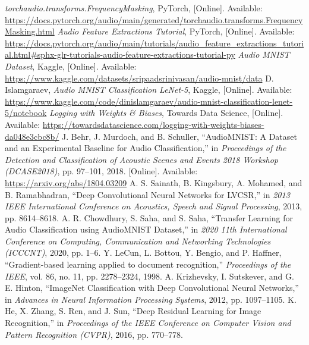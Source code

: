 \documentclass[conference]{IEEEtran}
\begin{document}
\begin{thebibliography}{00}
 \textit{torchaudio.transforms.FrequencyMasking}, PyTorch, [Online]. Available: \url{https://docs.pytorch.org/audio/main/generated/torchaudio.transforms.FrequencyMasking.html}
 \textit{Audio Feature Extractions Tutorial}, PyTorch, [Online]. Available: \url{https://docs.pytorch.org/audio/main/tutorials/audio_feature_extractions_tutorial.html#sphx-glr-tutorials-audio-feature-extractions-tutorial-py}
 \textit{Audio MNIST Dataset}, Kaggle, [Online]. Available: \url{https://www.kaggle.com/datasets/sripaadsrinivasan/audio-mnist/data}
 D. Islamgaraev, \textit{Audio MNIST Classification LeNet-5}, Kaggle, [Online]. Available: \url{https://www.kaggle.com/code/dinislamgaraev/audio-mnist-classification-lenet-5/notebook}
 \textit{Logging with Weights \& Biases}, Towards Data Science, [Online]. Available: \url{https://towardsdatascience.com/logging-with-weights-biases-da048e3cbc8b/}
J. Behr, J. Murdoch, and B. Schuller, ``AudioMNIST: A Dataset and an Experimental Baseline for Audio Classification,'' in \textit{Proceedings of the Detection and Classification of Acoustic Scenes and Events 2018 Workshop (DCASE2018)}, pp. 97--101, 2018. [Online]. Available: \url{https://arxiv.org/abs/1804.03209}
A. S. Sainath, B. Kingsbury, A. Mohamed, and B. Ramabhadran, ``Deep Convolutional Neural Networks for LVCSR,'' in \textit{2013 IEEE International Conference on Acoustics, Speech and Signal Processing}, 2013, pp. 8614--8618.
A. R. Chowdhury, S. Saha, and S. Saha, ``Transfer Learning for Audio Classification using AudioMNIST Dataset,'' in \textit{2020 11th International Conference on Computing, Communication and Networking Technologies (ICCCNT)}, 2020, pp. 1--6.
Y. LeCun, L. Bottou, Y. Bengio, and P. Haffner, ``Gradient-based learning applied to document recognition,'' \textit{Proceedings of the IEEE}, vol. 86, no. 11, pp. 2278--2324, 1998.
A. Krizhevsky, I. Sutskever, and G. E. Hinton, ``ImageNet Classification with Deep Convolutional Neural Networks,'' in \textit{Advances in Neural Information Processing Systems}, 2012, pp. 1097--1105.
K. He, X. Zhang, S. Ren, and J. Sun, ``Deep Residual Learning for Image Recognition,'' in \textit{Proceedings of the IEEE Conference on Computer Vision and Pattern Recognition (CVPR)}, 2016, pp. 770--778.

\end{thebibliography}
\end{document}
